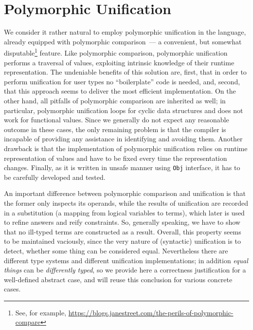 \section{Polymorphic Unification}
\label{sec:unification}

We consider it rather natural to employ polymorphic unification in the language, already equipped 
with polymorphic comparison~--- a convenient, but somewhat disputable\footnote{See, for example, 
\url{https://blogs.janestreet.com/the-perils-of-polymorphic-compare}} feature. Like polymorphic comparison, 
polymorphic unification performs a traversal of values, exploiting intrinsic knowledge of their runtime 
representation. The undeniable benefits of this solution are, first, that in order to perform unification 
for user types no ``boilerplate'' code is needed, and, second, that this approach seems to deliver the
most efficient implementation.
On the other hand, all pitfalls of polymorphic comparison are inherited as 
well; in particular, polymorphic unification loops for cyclic data structures and does not work for functional 
values. Since we generally do not expect any reasonable outcome in these cases, the only remaining problem is that
the compiler is incapable of providing any assistance in identifying and avoiding them. Another drawback is that 
the implementation of polymorphic unification relies on runtime representation of values and have to be fixed 
every time the representation changes.  Finally, as it is written in unsafe manner using \lstinline{Obj} interface, 
it has to be carefully developed and tested.

An important difference between polymorphic comparison and unification is that the former only inspects its operands, 
while the results of unification are recorded in a substitution (a mapping from logical variables to terms), which 
later is used to refine answers and reify constraints. So, generally speaking, we have to show that no ill-typed 
terms are constructed as a result. Overall, this property seems to be maintained vaciously, since the very 
nature of (syntactic) unification is to detect, whether some thing can be considered equal. Nevertheless there are
different type systems and different unification implementations; in addition \emph{equal things} can be
\emph{differently typed}, so we provide here a correctness justification for a well-defined abstract case, and will 
reuse this conclusion for various concrete cases.

